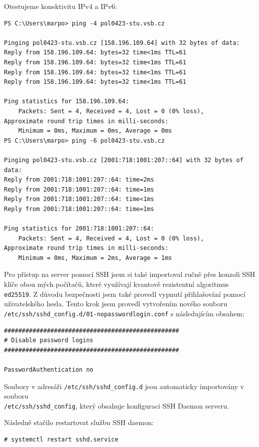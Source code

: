 Otestujeme konektivitu IPv4 a IPv6:

\begin{verbatim}
PS C:\Users\marpo> ping -4 pol0423-stu.vsb.cz

Pinging pol0423-stu.vsb.cz [158.196.109.64] with 32 bytes of data:
Reply from 158.196.109.64: bytes=32 time<1ms TTL=61
Reply from 158.196.109.64: bytes=32 time<1ms TTL=61
Reply from 158.196.109.64: bytes=32 time<1ms TTL=61
Reply from 158.196.109.64: bytes=32 time<1ms TTL=61

Ping statistics for 158.196.109.64:
    Packets: Sent = 4, Received = 4, Lost = 0 (0% loss),
Approximate round trip times in milli-seconds:
    Minimum = 0ms, Maximum = 0ms, Average = 0ms
PS C:\Users\marpo> ping -6 pol0423-stu.vsb.cz

Pinging pol0423-stu.vsb.cz [2001:718:1001:207::64] with 32 bytes of data:
Reply from 2001:718:1001:207::64: time=2ms
Reply from 2001:718:1001:207::64: time=1ms
Reply from 2001:718:1001:207::64: time<1ms
Reply from 2001:718:1001:207::64: time=1ms

Ping statistics for 2001:718:1001:207::64:
    Packets: Sent = 4, Received = 4, Lost = 0 (0% loss),
Approximate round trip times in milli-seconds:
    Minimum = 0ms, Maximum = 2ms, Average = 1ms
\end{verbatim}

Pro přístup na server pomocí SSH jsem si také importoval ručně
přes konzoli SSH klíče obou mých počítačů, které využívají kvantově
rezistentní algoritmus \texttt{ed25519}. Z důvodu bezpečnosti jsem
také provedl vypnutí přihlašování pomocí uživatelského hesla.
Tento krok jsem provedl vytvořením nového souboru
\texttt{/etc/ssh/sshd\_config.d/01-nopasswordlogin.conf}
s následujícím obsahem:

\begin{verbatim}
#################################################
# Disable password logins
#################################################

PasswordAuthentication no
\end{verbatim}

Soubory v adresáři \texttt{/etc/ssh/sshd\_config.d} jsou automaticky
importovány v souboru\\
\texttt{/etc/ssh/sshd\_config}, který obsahuje konfiguraci SSH Daemon
serveru.

Následně stačilo restartovat službu SSH daemon:

\begin{verbatim}
# systemctl restart sshd.service
\end{verbatim}


